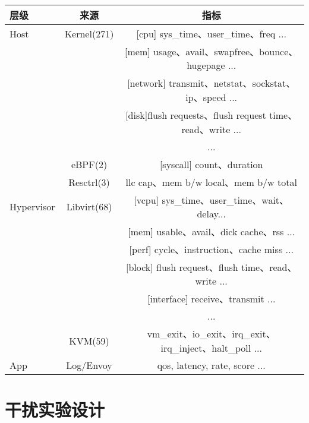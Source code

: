 \begin{table}
    \label{tab:metric_list}
    \footnotesize%
    \setlength{\tabcolsep}{4pt}%
    \renewcommand{\arraystretch}{1.5}%
    \centering
    \begin{tabular}{lcc}
        \hline
        层级 & 来源 & 指标\\
        \hline
        Host & Kernel(271) & [cpu] sys\_time、user\_time、freq ... \\
        & & [mem] usage、avail、swapfree、bounce、hugepage ...\\
        & & [network] transmit、netstat、sockstat、ip、speed ...\\
        & & [disk]flush requests、flush request time、read、write ...\\
        & & ...\\
        & eBPF(2) & [syscall] count、duration\\
        & Resctrl(3) & llc cap、mem b/w local、mem b/w total\\
        Hypervisor & Libvirt(68) & [vcpu] sys\_time、user\_time、wait、delay...\\
        & & [mem] usable、avail、dick cache、rss ...\\
        & & [perf] cycle、instruction、cache miss ...\\
        & & [block] flush request、flush time、read、write ...\\
        & & [interface] receive、transmit ...\\
        & & ...\\
        & KVM(59) & vm\_exit、io\_exit、irq\_exit、irq\_inject、halt\_poll ...\\
        App & Log/Envoy & qos, latency, rate, score ...\\
        \hline
    \end{tabular}
\end{table}


\section{干扰实验设计}


